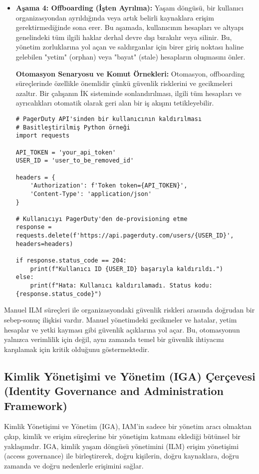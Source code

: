 \begin{itemize}
    \item \textbf{Aşama 4: Offboarding (İşten Ayrılma):} Yaşam döngüsü, bir kullanıcı organizasyondan ayrıldığında veya artık belirli kaynaklara erişim gerektirmediğinde sona erer. Bu aşamada, kullanıcının hesapları ve altyapı genelindeki tüm ilgili haklar derhal devre dışı bırakılır veya silinir. Bu, yönetim zorluklarına yol açan ve saldırganlar için birer giriş noktası haline gelebilen "yetim" (orphan) veya "bayat" (stale) hesapların oluşmasını önler.

    \textbf{Otomasyon Senaryosu ve Komut Örnekleri:} Otomasyon, offboarding süreçlerinde özellikle önemlidir çünkü güvenlik risklerini ve gecikmeleri azaltır. Bir çalışanın İK sisteminde sonlandırılması, ilgili tüm hesapları ve ayrıcalıkları otomatik olarak geri alan bir iş akışını tetikleyebilir.
\begin{verbatim}
# PagerDuty API'sinden bir kullanıcının kaldırılması
# Basitleştirilmiş Python örneği
import requests

API_TOKEN = 'your_api_token'
USER_ID = 'user_to_be_removed_id'

headers = {
    'Authorization': f'Token token={API_TOKEN}',
    'Content-Type': 'application/json'
}

# Kullanıcıyı PagerDuty'den de-provisioning etme
response = requests.delete(f'https://api.pagerduty.com/users/{USER_ID}', headers=headers)

if response.status_code == 204:
    print(f"Kullanıcı ID {USER_ID} başarıyla kaldırıldı.")
else:
    print(f"Hata: Kullanıcı kaldırılamadı. Status kodu: {response.status_code}")
\end{verbatim}
\end{itemize}

Manuel ILM süreçleri ile organizasyondaki güvenlik riskleri arasında doğrudan bir sebep-sonuç ilişkisi vardır. Manuel yönetimdeki gecikmeler ve hatalar, yetim hesaplar ve yetki kayması gibi güvenlik açıklarına yol açar. Bu, otomasyonun yalnızca verimlilik için değil, aynı zamanda temel bir güvenlik ihtiyacını karşılamak için kritik olduğunu göstermektedir.

\subsection{Kimlik Yönetişimi ve Yönetim (IGA) Çerçevesi (Identity Governance and Administration Framework)}

Kimlik Yönetişimi ve Yönetim (IGA), IAM'in sadece bir yönetim aracı olmaktan çıkıp, kimlik ve erişim süreçlerine bir yönetişim katmanı eklediği bütünsel bir yaklaşımdır. IGA, kimlik yaşam döngüsü yönetimini (ILM) erişim yönetişimi (access governance) ile birleştirerek, doğru kişilerin, doğru kaynaklara, doğru zamanda ve doğru nedenlerle erişimini sağlar.

